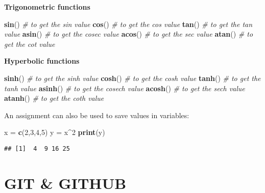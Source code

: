 \documentclass[
]{article}
\newenvironment{Shaded}{\begin{snugshade}}{\end{snugshade}}
\newcommand{\CommentTok}[1]{\textcolor[rgb]{0.56,0.35,0.01}{\textit{#1}}}
\newcommand{\DecValTok}[1]{\textcolor[rgb]{0.00,0.00,0.81}{#1}}
\newcommand{\FunctionTok}[1]{\textcolor[rgb]{0.13,0.29,0.53}{\textbf{#1}}}
\newcommand{\NormalTok}[1]{#1}
\newcommand{\OtherTok}[1]{\textcolor[rgb]{0.56,0.35,0.01}{#1}}
\newcommand{\SpecialCharTok}[1]{\textcolor[rgb]{0.81,0.36,0.00}{\textbf{#1}}}
\begin{document}
\textbf{Trigonometric functions}

\begin{Shaded}
\begin{Highlighting}[]
\FunctionTok{sin}\NormalTok{()  }\CommentTok{\# to get the sin value}
\FunctionTok{cos}\NormalTok{()  }\CommentTok{\# to get the cos value}
\FunctionTok{tan}\NormalTok{()  }\CommentTok{\# to get the tan value}
\FunctionTok{asin}\NormalTok{() }\CommentTok{\# to get the cosec value}
\FunctionTok{acos}\NormalTok{() }\CommentTok{\# to get the sec value}
\FunctionTok{atan}\NormalTok{() }\CommentTok{\# to get the cot value}
\end{Highlighting}
\end{Shaded}

\textbf{Hyperbolic functions}

\begin{Shaded}
\begin{Highlighting}[]
\FunctionTok{sinh}\NormalTok{()  }\CommentTok{\# to get the sinh value}
\FunctionTok{cosh}\NormalTok{()  }\CommentTok{\# to get the cosh value}
\FunctionTok{tanh}\NormalTok{()  }\CommentTok{\# to get the tanh value}
\FunctionTok{asinh}\NormalTok{() }\CommentTok{\# to get the cosech value}
\FunctionTok{acosh}\NormalTok{() }\CommentTok{\# to get the sech value}
\FunctionTok{atanh}\NormalTok{() }\CommentTok{\# to get the coth value}
\end{Highlighting}
\end{Shaded}

An assignment can also be used to save values in variables:

\begin{Shaded}
\begin{Highlighting}[]
\NormalTok{x }\OtherTok{=} \FunctionTok{c}\NormalTok{(}\DecValTok{2}\NormalTok{,}\DecValTok{3}\NormalTok{,}\DecValTok{4}\NormalTok{,}\DecValTok{5}\NormalTok{)}
\NormalTok{y }\OtherTok{=}\NormalTok{ x}\SpecialCharTok{\^{}}\DecValTok{2} 
\FunctionTok{print}\NormalTok{(y)}
\end{Highlighting}
\end{Shaded}

\begin{verbatim}
## [1]  4  9 16 25
\end{verbatim}

\newpage

\section{GIT \& GITHUB}\label{git-github}
\end{document}
